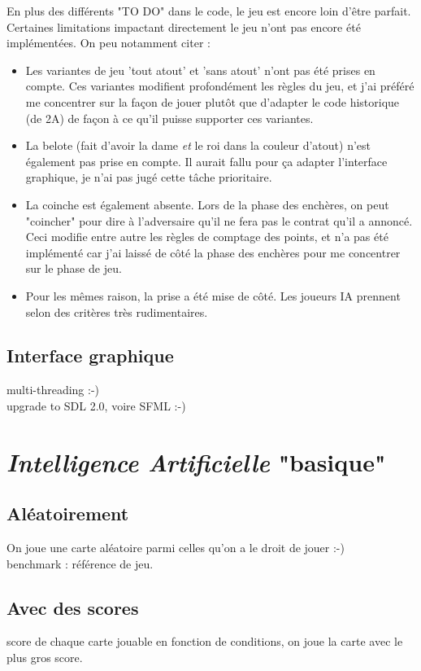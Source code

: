 \documentclass[a4paper,11pt]{article}
\begin{document}
En plus des différents "TO DO" dans le code, le jeu est encore loin d'être parfait. Certaines limitations impactant directement le jeu n'ont pas encore été implémentées. On peu notamment citer :
\begin{itemize}
\item Les variantes de jeu 'tout atout' et 'sans atout' n'ont pas été prises en compte. Ces variantes modifient profondément les règles du jeu, et j'ai préféré me concentrer sur la façon de jouer plutôt que d'adapter le code historique (de 2A) de façon à ce qu'il puisse supporter ces variantes.
\item La belote (fait d'avoir la dame \textit{et} le roi dans la couleur d'atout) n'est également pas prise en compte. Il aurait fallu pour ça adapter l'interface graphique, je n'ai pas jugé cette tâche prioritaire.
\item La coinche est également absente. Lors de la phase des enchères, on peut "coincher" pour dire à l'adversaire qu'il ne fera pas le contrat qu'il a annoncé. Ceci modifie entre autre les règles de comptage des points, et n'a pas été implémenté car j'ai laissé de côté la phase des enchères pour me concentrer sur le phase de jeu.
\item Pour les mêmes raison, la prise a été mise de côté. Les joueurs IA prennent selon des critères très rudimentaires.
\end{itemize}

\subsection{Interface graphique}
multi-threading :-) \\

upgrade to SDL 2.0, voire SFML :-)

\clearpage
\section{\textit{Intelligence Artificielle} "basique"}
\subsection{Aléatoirement}
On joue une carte aléatoire parmi celles qu'on a le droit de jouer :-)\\

benchmark : référence de jeu.
\subsection{Avec des scores}
score de chaque carte jouable en fonction de conditions, on joue la carte avec le plus gros score. \\
\end{document}
